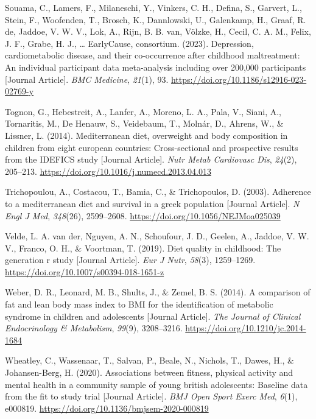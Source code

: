 \documentclass[
  letterpaper,
  DIV=11,
  numbers=noendperiod]{scrreport}
\newlength{\cslhangindent}
\newenvironment{CSLReferences}[2] %
 {\begin{list}{}{%
  \setlength{\itemindent}{0pt}
  \setlength{\leftmargin}{0pt}
  \setlength{\parsep}{0pt}
  \ifodd #1
   \setlength{\leftmargin}{\cslhangindent}
   \setlength{\itemindent}{-1\cslhangindent}
  \fi
  \setlength{\itemsep}{#2\baselineskip}}}
 {\end{list}}
\begin{document}
\begin{CSLReferences}{1}{0}
Souama, C., Lamers, F., Milaneschi, Y., Vinkers, C. H., Defina, S.,
Garvert, L., Stein, F., Woofenden, T., Brosch, K., Dannlowski, U.,
Galenkamp, H., Graaf, R. de, Jaddoe, V. W. V., Lok, A., Rijn, B. B. van,
Völzke, H., Cecil, C. A. M., Felix, J. F., Grabe, H. J., \ldots{}
EarlyCause, consortium. (2023). Depression, cardiometabolic disease, and
their co-occurrence after childhood maltreatment: An individual
participant data meta-analysis including over 200,000 participants
{[}Journal Article{]}. \emph{BMC Medicine}, \emph{21}(1), 93.
\url{https://doi.org/10.1186/s12916-023-02769-y}

Tognon, G., Hebestreit, A., Lanfer, A., Moreno, L. A., Pala, V., Siani,
A., Tornaritis, M., De Henauw, S., Veidebaum, T., Molnár, D., Ahrens,
W., \& Lissner, L. (2014). Mediterranean diet, overweight and body
composition in children from eight european countries: Cross-sectional
and prospective results from the IDEFICS study {[}Journal Article{]}.
\emph{Nutr Metab Cardiovasc Dis}, \emph{24}(2), 205--213.
\url{https://doi.org/10.1016/j.numecd.2013.04.013}

Trichopoulou, A., Costacou, T., Bamia, C., \& Trichopoulos, D. (2003).
Adherence to a mediterranean diet and survival in a greek population
{[}Journal Article{]}. \emph{N Engl J Med}, \emph{348}(26), 2599--2608.
\url{https://doi.org/10.1056/NEJMoa025039}

Velde, L. A. van der, Nguyen, A. N., Schoufour, J. D., Geelen, A.,
Jaddoe, V. W. V., Franco, O. H., \& Voortman, T. (2019). Diet quality in
childhood: The generation r study {[}Journal Article{]}. \emph{Eur J
Nutr}, \emph{58}(3), 1259--1269.
\url{https://doi.org/10.1007/s00394-018-1651-z}

Weber, D. R., Leonard, M. B., Shults, J., \& Zemel, B. S. (2014). A
comparison of fat and lean body mass index to BMI for the identification
of metabolic syndrome in children and adolescents {[}Journal Article{]}.
\emph{The Journal of Clinical Endocrinology \& Metabolism},
\emph{99}(9), 3208--3216. \url{https://doi.org/10.1210/jc.2014-1684}

Wheatley, C., Wassenaar, T., Salvan, P., Beale, N., Nichols, T., Dawes,
H., \& Johansen-Berg, H. (2020). Associations between fitness, physical
activity and mental health in a community sample of young british
adolescents: Baseline data from the fit to study trial {[}Journal
Article{]}. \emph{BMJ Open Sport Exerc Med}, \emph{6}(1), e000819.
\url{https://doi.org/10.1136/bmjsem-2020-000819}

\end{CSLReferences}
\end{document}
